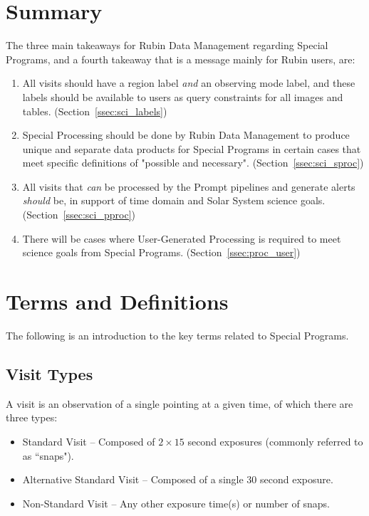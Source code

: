 \section{Summary} \label{sec:mem}

The three main takeaways for Rubin Data Management regarding Special Programs,
and a fourth takeaway that is a message mainly for Rubin users, are:

\begin{enumerate}

\item All visits should have a region label \textit{and} an observing mode
label, and these labels should be available to users as query constraints for
all images and tables.
(Section~\ref{ssec:sci_labels})

\item Special Processing should be done by Rubin Data Management to
produce unique and separate data products for Special Programs in
certain cases that meet specific definitions of "possible and necessary".
(Section~\ref{ssec:sci_sproc})

\item All visits that \emph{can} be processed by the Prompt pipelines and generate
alerts \emph{should} be, in support of time domain and Solar System science goals.
(Section~\ref{ssec:sci_pproc})

\item There will be cases where User-Generated Processing is required to meet
science goals from Special Programs.
(Section~\ref{ssec:proc_user})

\end{enumerate}


\section{Terms and Definitions}\label{sec:intro}

The following is an introduction to the key terms related to Special Programs.

\subsection{Visit Types}

A visit is an observation of a single pointing at a given time, of which
there are three types:

\begin{itemize}
\item Standard Visit -- Composed of $2\times15$ second exposures (commonly referred to as ``snaps").
\item Alternative Standard Visit -- Composed of a single $30$ second exposure.
\item Non-Standard Visit -- Any other exposure time(s) or number of snaps.
\end{itemize}


